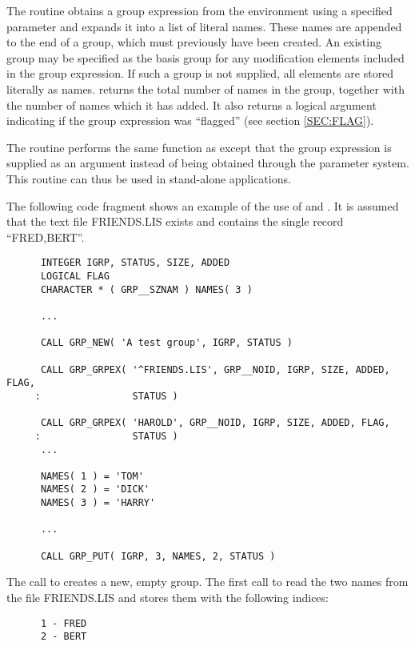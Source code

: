 The routine  obtains a group expression from the environment using a
specified parameter and expands it into a list of literal names. These names are
appended to the end of a group, which must previously have been created. An
existing group may be specified as the basis group for any modification elements
included in the group expression. If such a group is not supplied, all elements
are stored literally as names.  returns the total number of names in
the group, together with the number of names which it has added. It also returns
a logical argument indicating if the group expression was ``flagged'' (see
section \ref{SEC:FLAG}).

The routine  performs the same function as  except
that the group expression is supplied as an argument instead of being
obtained through the parameter system. This routine can thus be used in
stand-alone applications.

The following code fragment shows an example of the use of  and
. It is assumed that the text file FRIENDS.LIS exists and contains the
single record ``FRED,BERT''.

\small
\begin{verbatim}
      INTEGER IGRP, STATUS, SIZE, ADDED
      LOGICAL FLAG
      CHARACTER * ( GRP__SZNAM ) NAMES( 3 )

      ...

      CALL GRP_NEW( 'A test group', IGRP, STATUS )

      CALL GRP_GRPEX( '^FRIENDS.LIS', GRP__NOID, IGRP, SIZE, ADDED, FLAG,
     :                STATUS )

      CALL GRP_GRPEX( 'HAROLD', GRP__NOID, IGRP, SIZE, ADDED, FLAG,
     :                STATUS )
      ...

      NAMES( 1 ) = 'TOM'
      NAMES( 2 ) = 'DICK'
      NAMES( 3 ) = 'HARRY'

      ...

      CALL GRP_PUT( IGRP, 3, NAMES, 2, STATUS )
\end{verbatim}
\normalsize

The call to  creates a new, empty group. The first call to 
read the two names from the file FRIENDS.LIS and stores them with the following
indices:

\small
\begin{verbatim}
      1 - FRED
      2 - BERT
\end{verbatim}
\normalsize

